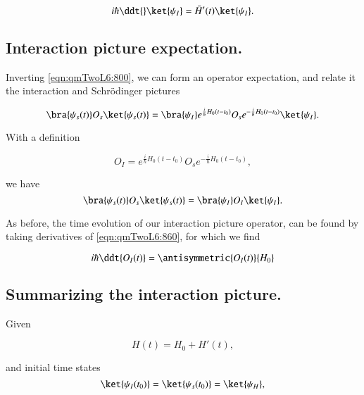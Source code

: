 \begin{equation}\label{eqn:qmTwoL6:820}
i \hbar \ddt{} 
\ket{\psi_I} 
= \bar{H}'(t) 
\ket{\psi_I}.
\end{equation}

\subsection{Interaction picture expectation.}

Inverting \ref{eqn:qmTwoL6:800}, we can form an operator expectation, and relate it the interaction and Schr\"{o}dinger pictures

\begin{equation}\label{eqn:qmTwoL6:840}
\bra{\psi_s(t)} O_s \ket{\psi_s(t)} =
\bra{\psi_I} 
e^{\frac{i}{\hbar} H_0(t - t_0)}
O_s
e^{-\frac{i}{\hbar} H_0(t - t_0)}
\ket{\psi_I} .
\end{equation}

With a definition

\begin{equation}\label{eqn:qmTwoL6:860}
O_I =
e^{\frac{i}{\hbar} H_0(t - t_0)}
O_s
e^{-\frac{i}{\hbar} H_0(t - t_0)},
\end{equation}

we have
\begin{equation}\label{eqn:qmTwoL6:880}
\bra{\psi_s(t)} O_s \ket{\psi_s(t)} =
\bra{\psi_I} 
O_I
\ket{\psi_I}.
\end{equation}

As before, the time evolution of our interaction picture operator, can be found by taking derivatives of \ref{eqn:qmTwoL6:860}, for which we find

\begin{equation}\label{eqn:qmTwoL6:900}
i \hbar \ddt{O_I(t)} = \antisymmetric{O_I(t)}{H_0}
\end{equation}

\subsection{Summarizing the interaction picture.}

Given 

\begin{equation}\label{eqn:qmTwoL6:910}
H(t) = H_0 + H'(t),
\end{equation}

and initial time states
\begin{equation}\label{eqn:qmTwoL6:950}
\ket{\psi_I(t_0)} =
\ket{\psi_s(t_0)} = \ket{\psi_H},
\end{equation}

